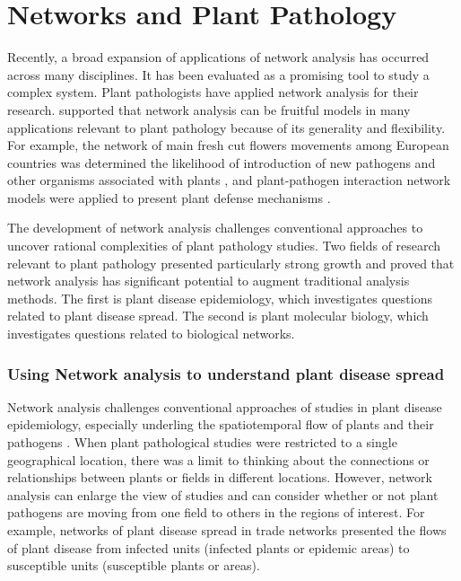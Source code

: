 \documentclass[12pt, oneside]{report}
\begin{document}
\section*{Networks and Plant Pathology}

Recently, a broad expansion of applications of network analysis has occurred across many disciplines. It has been evaluated as a promising tool to study a complex system. Plant pathologists have applied network analysis for their research. \citet{Lefebvre:2011fo, Jeger:2007tn, windram2014network} supported that network analysis can be fruitful models in many applications relevant to plant pathology because of its generality and flexibility. For example, the network of main fresh cut flowers movements among European countries was determined the likelihood of introduction of new pathogens and other organisms associated with plants \citep{eagling2007australian}, and plant-pathogen interaction network models were applied to present plant defense mechanisms \citep{dietz2010hubs}. 

The development of network analysis challenges conventional approaches to uncover rational complexities of plant pathology studies. Two fields of research relevant to plant pathology presented particularly strong growth and proved that network analysis has significant potential to augment traditional analysis methods. The first is plant disease epidemiology, which investigates questions related to plant disease spread. The second is plant molecular biology, which investigates questions related to biological networks.

\subsubsection*{Using Network analysis to understand plant disease spread}

Network analysis challenges conventional approaches of studies in plant disease epidemiology, especially underling the spatiotemporal flow of plants and their pathogens \citep{Moslonka2010}. When plant pathological studies were restricted to a single geographical location, there was a limit to thinking about the connections or relationships between plants or fields in different locations. However, network analysis can enlarge the view of studies and can consider whether or not plant pathogens are moving from one field to others in the regions of interest. For example, networks of plant disease spread in trade networks presented the flows of plant disease from infected units (infected plants or epidemic areas) to susceptible units (susceptible plants or areas).
\end{document}

